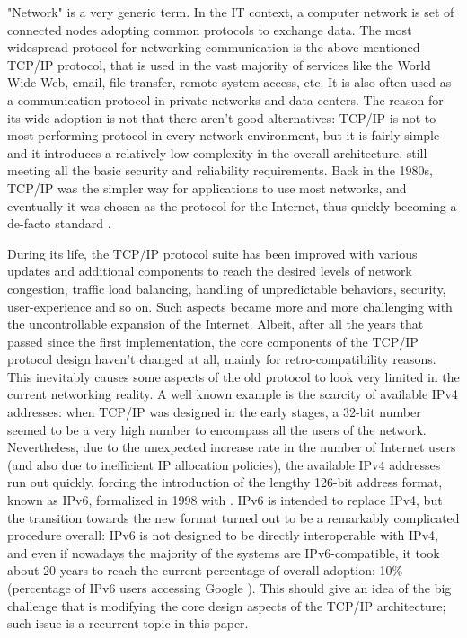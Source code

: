 "Network" is a very generic term. In the IT context, a computer network is set of connected nodes adopting common protocols to exchange data. The most widespread protocol for networking communication is the above-mentioned TCP/IP protocol, that is used in the vast majority of services like the World Wide Web, email, file transfer, remote system access, etc. It is also often used as a communication protocol in private networks and data centers.
The reason for its wide adoption is not that there aren't good alternatives: TCP/IP is not to most performing protocol in every network environment, but it is fairly simple and it introduces a relatively low complexity in the overall architecture, still meeting all the basic security and reliability requirements. Back in the 1980s, TCP/IP was the simpler way for applications to use most networks, and eventually it was chosen as the protocol for the Internet, thus quickly becoming a de-facto standard \cite{computerworld}. 

During its life, the TCP/IP protocol suite has been improved with various updates and additional components to reach the desired levels of network congestion, traffic load balancing, handling of unpredictable behaviors, security, user-experience and so on. Such aspects became more and more challenging with the uncontrollable expansion of the Internet. 
Albeit, after all the years that passed since the first implementation, the core components of the TCP/IP protocol design haven't changed at all, mainly for retro-compatibility reasons. This inevitably causes some aspects of the old protocol to look very limited in the current networking reality. A well known example is the scarcity of available IPv4 addresses: when TCP/IP was designed in the early stages, a 32-bit number seemed to be a very high number to encompass all the users of the network. Nevertheless, due to the unexpected increase rate in the number of Internet users (and also due to inefficient IP allocation policies), the available IPv4 addresses run out quickly, forcing the introduction of the lengthy 126-bit address format, known as IPv6, formalized in 1998 with . IPv6 is intended to replace IPv4, but the transition towards the new format turned out to be a remarkably complicated procedure overall: IPv6 is not designed to be directly interoperable with IPv4, and even if nowadays the majority of the systems are IPv6-compatible, it took about 20 years to reach the current percentage of overall adoption: 10\% (percentage of IPv6 users accessing Google \cite{google}). This should give an idea of the big challenge that is modifying the core design aspects of the TCP/IP architecture; such issue is a recurrent topic in this paper.


